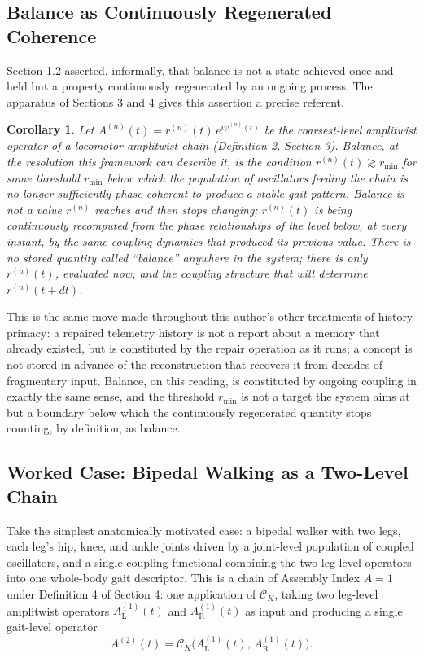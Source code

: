 \documentclass[12pt]{article}
\newtheorem{corollary}{Corollary}
\begin{document}
\subsection{Balance as Continuously Regenerated Coherence}

Section 1.2 asserted, informally, that balance is not a state achieved once and held but a property continuously regenerated by an ongoing process. The apparatus of Sections 3 and 4 gives this assertion a precise referent.

\begin{corollary}
Let $A^{(n)}(t) = r^{(n)}(t)\,e^{i\psi^{(n)}(t)}$ be the coarsest-level amplitwist operator of a locomotor amplitwist chain (Definition 2, Section 3). Balance, at the resolution this framework can describe it, is the condition $r^{(n)}(t) \gtrsim r_{\min}$ for some threshold $r_{\min}$ below which the population of oscillators feeding the chain is no longer sufficiently phase-coherent to produce a stable gait pattern. Balance is not a value $r^{(n)}$ reaches and then stops changing; $r^{(n)}(t)$ is being continuously recomputed from the phase relationships of the level below, at every instant, by the same coupling dynamics that produced its previous value. There is no stored quantity called ``balance'' anywhere in the system; there is only $r^{(n)}(t)$, evaluated now, and the coupling structure that will determine $r^{(n)}(t + dt)$.
\end{corollary}

This is the same move made throughout this author's other treatments of history-primacy: a repaired telemetry history is not a report about a memory that already existed, but is constituted by the repair operation as it runs; a concept is not stored in advance of the reconstruction that recovers it from decades of fragmentary input. Balance, on this reading, is constituted by ongoing coupling in exactly the same sense, and the threshold $r_{\min}$ is not a target the system aims at but a boundary below which the continuously regenerated quantity stops counting, by definition, as balance.

\subsection{Worked Case: Bipedal Walking as a Two-Level Chain}

Take the simplest anatomically motivated case: a bipedal walker with two legs, each leg's hip, knee, and ankle joints driven by a joint-level population of coupled oscillators, and a single coupling functional combining the two leg-level operators into one whole-body gait descriptor. This is a chain of Assembly Index $A = 1$ under Definition 4 of Section 4: one application of $\mathcal{C}_K$, taking two leg-level amplitwist operators $A^{(1)}_{\text{L}}(t)$ and $A^{(1)}_{\text{R}}(t)$ as input and producing a single gait-level operator
\[
A^{(2)}(t) = \mathcal{C}_K\big(A^{(1)}_{\text{L}}(t),\, A^{(1)}_{\text{R}}(t)\big).
\]
\end{document}
